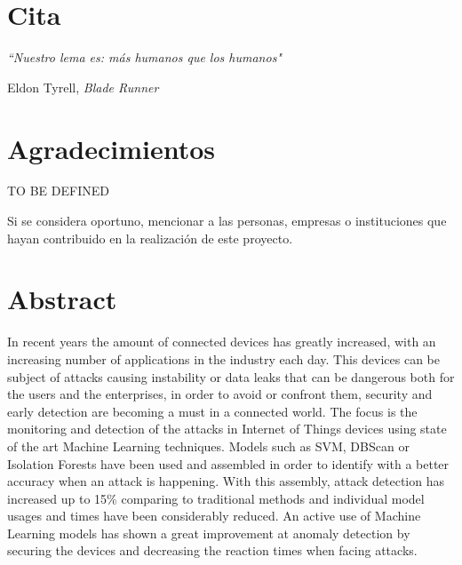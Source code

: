 \chapter*{Cita}

\setlength{}
\setlength\epigraphrule{0pt}

\epigraph{\itshape``Nuestro lema es: más humanos que los humanos"}{Eldon Tyrell, \textit{Blade Runner}}

\chapter*{Agradecimientos}

TO BE DEFINED

Si se considera oportuno, mencionar a las personas, empresas o instituciones que hayan contribuido en la realización de este proyecto.

\chapter*{Abstract}

\onehalfspacing

In recent years the amount of connected devices has greatly increased, with an increasing number of applications in the industry each day. This devices can be subject of attacks causing instability or data leaks that can be dangerous both for the users and the enterprises, in order to avoid or confront them, security and early detection are becoming a must in a connected world. The focus is the monitoring and detection of the attacks in Internet of Things devices using state of the art Machine Learning techniques. Models such as SVM, DBScan or Isolation Forests have been used and assembled in order to identify with a better accuracy when an attack is happening. With this assembly, attack detection has increased up to 15\% comparing to traditional methods and individual model usages and times have been considerably reduced. An active use of Machine Learning models has shown a great improvement at anomaly detection by securing the devices and decreasing the reaction times when facing attacks.

\vspace{0.5cm}

